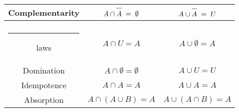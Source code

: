 \begin{tabular}{c|c|c}
\begin{minipage}{.25\textwidth} \rule{0pt}{22pt}Complementarity\rule[-10pt]{0pt}{10pt} \end{minipage} & 
\begin{minipage}{.35\textwidth} \centerline{$A \cap \overline{\rule{0pt}{9.5pt}A} \; = \; \emptyset$} \end{minipage} & 
\begin{minipage}{.35\textwidth} \centerline{$A \cup \overline{\rule{0pt}{9.5pt}A} \; = \; U$} \end{minipage} \\ \hline 
\begin{minipage}{.25\textwidth} \rule{0pt}{22pt}Identity \\ \rule{12pt}{0pt} laws\rule[-10pt]{0pt}{10pt} \end{minipage} & 
\begin{minipage}{.35\textwidth} \centerline{$A \cap U = A$} \end{minipage} & 
\begin{minipage}{.35\textwidth} \centerline{$A \cup \emptyset = A$} \end{minipage} \\ \hline 
\begin{minipage}{.25\textwidth} \rule{0pt}{22pt}Domination\rule[-10pt]{0pt}{10pt} \end{minipage} & 
\begin{minipage}{.35\textwidth}  \centerline{$A \cap \emptyset = \emptyset$} \end{minipage} & 
\begin{minipage}{.35\textwidth} \centerline{$A \cup U = U$} \end{minipage} \\ \hline
\begin{minipage}{.25\textwidth} \rule{0pt}{22pt}Idempotence\rule[-10pt]{0pt}{10pt} \end{minipage} & 
\begin{minipage}{.35\textwidth} \centerline{$A \cap A = A$} \end{minipage} & 
\begin{minipage}{.35\textwidth} \centerline{$A \cup A = A$} \end{minipage} \\ \hline
\begin{minipage}{.25\textwidth} \rule{0pt}{22pt}Absorption\rule[-10pt]{0pt}{10pt} \end{minipage} & 
\begin{minipage}{.35\textwidth} \centerline{$A \cap (A \cup B) = A$} \end{minipage} & 
\begin{minipage}{.35\textwidth} \centerline{$A \cup (A \cap B) = A$} \end{minipage} \\
\end{tabular} 


